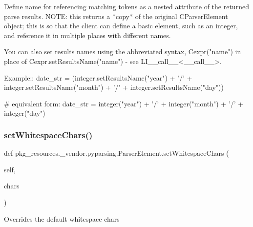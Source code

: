 \begin{DoxyVerb}Define name for referencing matching tokens as a nested attribute
of the returned parse results.
NOTE: this returns a *copy* of the original C{ParserElement} object;
this is so that the client can define a basic element, such as an
integer, and reference it in multiple places with different names.

You can also set results names using the abbreviated syntax,
C{expr("name")} in place of C{expr.setResultsName("name")} - 
see L{I{__call__}<__call__>}.

Example::
    date_str = (integer.setResultsName("year") + '/' 
        + integer.setResultsName("month") + '/' 
        + integer.setResultsName("day"))

    # equivalent form:
    date_str = integer("year") + '/' + integer("month") + '/' + integer("day")
\end{DoxyVerb}
 \mbox{\label{classpkg__resources_1_1__vendor_1_1pyparsing_1_1ParserElement_af541c731255fb5cc4e407841848e0bc5}} 
\subsubsection{\texorpdfstring{set\+Whitespace\+Chars()}{setWhitespaceChars()}}
{\footnotesize\ttfamily def pkg\+\_\+resources.\+\_\+vendor.\+pyparsing.\+Parser\+Element.\+set\+Whitespace\+Chars (\begin{DoxyParamCaption}\item[{}]{self,  }\item[{}]{chars }\end{DoxyParamCaption})}

\begin{DoxyVerb}Overrides the default whitespace chars
\end{DoxyVerb}
 \mbox{\label{classpkg__resources_1_1__vendor_1_1pyparsing_1_1ParserElement_a07496b6487e5aa0d90619fa4655e8393}} 
